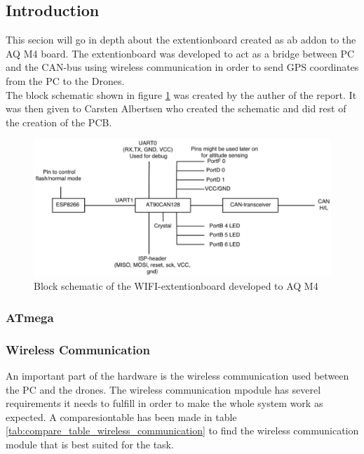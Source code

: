 \subsection{Introduction}
This secion will go in depth about the extentionboard created as ab addon to the AQ M4 board. The extentionboard was developed to act as a bridge between PC and the CAN-bus using wireless communication in order to send GPS coordinates from the PC to the Drones.\\

The block schematic shown in figure \ref{fig:PCB_block} was created by the auther of the report. It was then given to Carsten Albertsen who created the schematic and did rest of the creation of the PCB.
\\
\begin{figure}[H]
    \center
    \includegraphics[width=1\textwidth]{graphics/PCB_block_v3.eps}
    \caption{Block schematic of the WIFI-extentionboard developed to AQ M4}
    \label{fig:PCB_block}
\end{figure}

\subsubsection{ATmega}
\subsubsection{Wireless Communication}
An important part of the hardware is the wireless communication used between the PC and the drones.
The wireless communication mpodule has severel requirements it needs to fulfill in order to make the whole system work as expected. A comparesiontable has been made in table \ref{tab:compare_table_wireless_communication} to find the wireless communication module that is best suited for the task.


